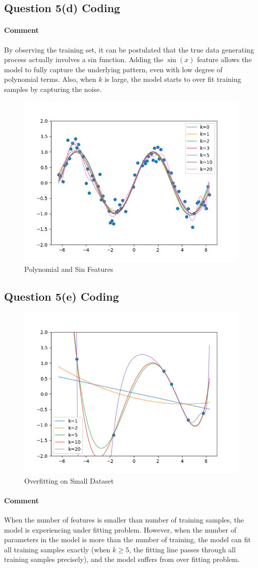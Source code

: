 \documentclass[11pt]{article}
\begin{document}
	\subsection{Question 5(d) Coding}
	\paragraph{Comment} By observing the training set, it can be postulated that the true data generating process actually involves a sin function. Adding the $\sin(x)$ feature allows the model to fully capture the underlying pattern, even with low degree of polynomial terms. Also, when $k$ is large, the model starts to over fit training samples by capturing the noise.
	\begin{figure}[h]
		\centering
		\includegraphics[width=0.6\linewidth]{src/featuremaps/5d.png}
		\caption{Polynomial and Sin Features}
	\end{figure}
	
	\newpage
	\subsection{Question 5(e) Coding}
	\begin{figure}[h]
		\centering
		\includegraphics[width=0.6\linewidth]{src/featuremaps/5e.png}
		\caption{Overfitting on Small Dataset}
	\end{figure}
	\paragraph{Comment} When the number of features is smaller than number of training samples, the model is experiencing under fitting problem. However, when the number of parameters in the model is more than the number of training, the model can fit all training samples exactly (when $k \geq 5$, the fitting line passes through all training samples precisely), and the model suffers from over fitting problem.
\end{document}
